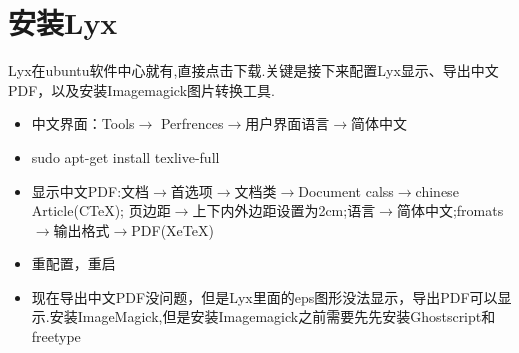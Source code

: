 \documentclass[utf8]{book}
\begin{document}
\begin{appendices}
\begin{itemize}
	\end{itemize}
	\section{安装Lyx}\label{u12}
	Lyx在ubuntu软件中心就有,直接点击下载.关键是接下来配置Lyx显示、导出中文PDF，以及安装Imagemagick图片转换工具.
	\begin{itemize}
		\item 中文界面：Tools$\longrightarrow$ Perfrences$\longrightarrow$用户界面语言$\longrightarrow$简体中文
		\item sudo apt-get install texlive-full
		\item 显示中文PDF:文档$\longrightarrow$首选项$\longrightarrow$文档类$\longrightarrow$Document calss$\longrightarrow$chinese Article(CTeX);
		页边距$\longrightarrow$上下内外边距设置为2cm;语言$\longrightarrow$简体中文;fromats$\longrightarrow$输出格式$\longrightarrow$PDF(XeTeX)
		\item 重配置，重启
		\item 现在导出中文PDF没问题，但是Lyx里面的eps图形没法显示，导出PDF可以显示.安装ImageMagick,但是安装Imagemagick之前需要先先安装Ghostscript和freetype
		

\end{itemize}
\end{appendices}
\end{document}
